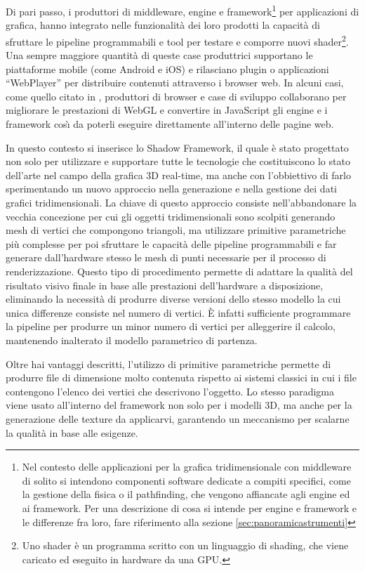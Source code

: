 Di pari passo, i produttori di middleware, engine e framework\footnote{Nel contesto delle applicazioni per la grafica tridimensionale con middleware di solito si intendono componenti software dedicate a compiti specifici, come la gestione della fisica o il pathfinding, che vengono affiancate agli engine ed ai framework. Per una descrizione di cosa si intende per engine e framework e le differenze fra loro, fare riferimento alla sezione \ref{sec:panoramicastrumenti}} per applicazioni di grafica, hanno integrato nelle funzionalit\`a dei loro prodotti la capacit\`a di sfruttare le pipeline programmabili e tool per testare e comporre nuovi shader\footnote{Uno shader \`e un programma scritto con un linguaggio di shading, che viene caricato ed eseguito in hardware da una \ac{GPU}.}. Una sempre maggiore quantit\`a di queste case produttrici supportano le piattaforme mobile (come Android e iOS) e rilasciano plugin o applicazioni ``WebPlayer'' per distribuire contenuti attraverso i browser web. 
In alcuni casi, come quello citato in \cite{site:mozillaunrealannounce}, produttori di browser e case di sviluppo collaborano per migliorare le prestazioni di WebGL e convertire in JavaScript gli engine e i framework cos{\`\i} da poterli eseguire direttamente all'interno delle pagine web.

In questo contesto si inserisce lo Shadow Framework, il quale \`e stato progettato non solo per utilizzare e supportare tutte le tecnologie che costituiscono lo stato dell'arte nel campo della grafica 3D real-time, ma anche con l'obbiettivo di farlo sperimentando un nuovo approccio nella generazione e nella gestione dei dati grafici tridimensionali. La chiave di questo approccio consiste nell'abbandonare la vecchia concezione per cui gli oggetti tridimensionali sono scolpiti generando mesh di vertici che compongono triangoli, ma utilizzare primitive parametriche pi\`u complesse per poi sfruttare le capacit\`a delle pipeline programmabili e far generare dall'hardware stesso le mesh di punti necessarie per il processo di renderizzazione.
Questo tipo di procedimento permette di adattare la qualit\`a  del risultato visivo finale in base alle prestazioni dell'hardware a disposizione, eliminando la necessit\`a di produrre diverse versioni dello stesso modello la cui unica differenze consiste nel numero di vertici. \`E infatti sufficiente programmare la pipeline per produrre un minor numero di vertici per alleggerire il calcolo, mantenendo inalterato il modello parametrico di partenza.

Oltre hai vantaggi descritti, l'utilizzo di primitive parametriche permette di produrre file di dimensione molto contenuta rispetto ai sistemi classici in cui i file contengono l'elenco dei vertici che descrivono l'oggetto. Lo stesso paradigma viene usato all'interno del framework non solo per i modelli 3D, ma anche per la generazione delle texture da applicarvi, garantendo un meccanismo per scalarne la qualit\`a in base alle esigenze.

